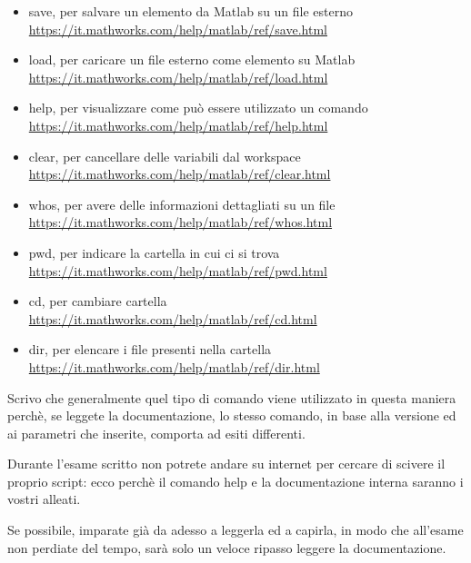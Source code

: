 \begin{itemize}
    \item save, per salvare un elemento da Matlab su un file esterno \\ \url{https://it.mathworks.com/help/matlab/ref/save.html} 
    \item load, per caricare un file esterno come elemento su Matlab \\ \url{https://it.mathworks.com/help/matlab/ref/load.html} 
    \item help, per visualizzare come può essere utilizzato un comando \\ \url{https://it.mathworks.com/help/matlab/ref/help.html} 
    \item clear, per cancellare delle variabili dal workspace \\ \url{https://it.mathworks.com/help/matlab/ref/clear.html} 
    \item whos, per avere delle informazioni dettagliati su un file \\ \url{https://it.mathworks.com/help/matlab/ref/whos.html} 
    \item pwd, per indicare la cartella in cui ci si trova \\ \url{https://it.mathworks.com/help/matlab/ref/pwd.html}  
    \item cd, per cambiare cartella \\ \url{https://it.mathworks.com/help/matlab/ref/cd.html} 
    \item dir, per elencare i file presenti nella cartella \\ \url{https://it.mathworks.com/help/matlab/ref/dir.html}
\end{itemize}

\begin{tcolorbox}
    Scrivo che generalmente quel tipo di comando viene utilizzato in questa maniera perchè, 
    se leggete la documentazione, lo stesso comando, in base alla versione ed ai parametri che inserite, 
    comporta ad esiti differenti. \newline 

    Durante l'esame scritto non potrete andare su internet per cercare di scivere il proprio script: 
    ecco perchè il comando help e la documentazione interna saranno i vostri alleati. \newline 

    Se possibile, imparate già da adesso a leggerla ed a capirla, in modo che all'esame non perdiate del tempo, sarà solo un veloce ripasso leggere la documentazione.  
\end{tcolorbox} 

